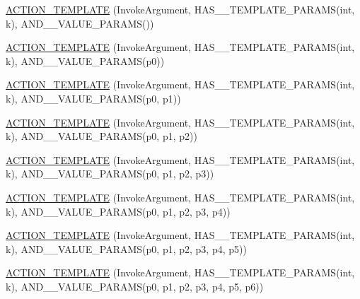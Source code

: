 \begin{DoxyCompactItemize}
\item 
\hyperlink{namespacetesting_a8a02397c7fdf8e84d559ab72dcc28eb1}{A\+C\+T\+I\+O\+N\+\_\+\+T\+E\+M\+P\+L\+A\+TE} (Invoke\+Argument, H\+A\+S\+\_\+\_\+\+T\+E\+M\+P\+L\+A\+T\+E\+\_\+\+P\+A\+R\+A\+MS(int, k), A\+N\+D\+\_\+\_\+\+V\+A\+L\+U\+E\+\_\+\+P\+A\+R\+A\+MS())
\item 
\hyperlink{namespacetesting_afaa0d88f5442f9aee5d6147377d3e50c}{A\+C\+T\+I\+O\+N\+\_\+\+T\+E\+M\+P\+L\+A\+TE} (Invoke\+Argument, H\+A\+S\+\_\+\_\+\+T\+E\+M\+P\+L\+A\+T\+E\+\_\+\+P\+A\+R\+A\+MS(int, k), A\+N\+D\+\_\+\_\+\+V\+A\+L\+U\+E\+\_\+\+P\+A\+R\+A\+MS(p0))
\item 
\hyperlink{namespacetesting_a39bf6c49dc1323cc9539a12249e60aba}{A\+C\+T\+I\+O\+N\+\_\+\+T\+E\+M\+P\+L\+A\+TE} (Invoke\+Argument, H\+A\+S\+\_\+\_\+\+T\+E\+M\+P\+L\+A\+T\+E\+\_\+\+P\+A\+R\+A\+MS(int, k), A\+N\+D\+\_\+\_\+\+V\+A\+L\+U\+E\+\_\+\+P\+A\+R\+A\+MS(p0, p1))
\item 
\hyperlink{namespacetesting_ac50647216fdf5197899a3d5034a9a670}{A\+C\+T\+I\+O\+N\+\_\+\+T\+E\+M\+P\+L\+A\+TE} (Invoke\+Argument, H\+A\+S\+\_\+\_\+\+T\+E\+M\+P\+L\+A\+T\+E\+\_\+\+P\+A\+R\+A\+MS(int, k), A\+N\+D\+\_\+\_\+\+V\+A\+L\+U\+E\+\_\+\+P\+A\+R\+A\+MS(p0, p1, p2))
\item 
\hyperlink{namespacetesting_ae98e43eecf8f44990b39b460f00b397b}{A\+C\+T\+I\+O\+N\+\_\+\+T\+E\+M\+P\+L\+A\+TE} (Invoke\+Argument, H\+A\+S\+\_\+\_\+\+T\+E\+M\+P\+L\+A\+T\+E\+\_\+\+P\+A\+R\+A\+MS(int, k), A\+N\+D\+\_\+\_\+\+V\+A\+L\+U\+E\+\_\+\+P\+A\+R\+A\+MS(p0, p1, p2, p3))
\item 
\hyperlink{namespacetesting_a505f6d82df233802c5f4235d77dca164}{A\+C\+T\+I\+O\+N\+\_\+\+T\+E\+M\+P\+L\+A\+TE} (Invoke\+Argument, H\+A\+S\+\_\+\_\+\+T\+E\+M\+P\+L\+A\+T\+E\+\_\+\+P\+A\+R\+A\+MS(int, k), A\+N\+D\+\_\+\_\+\+V\+A\+L\+U\+E\+\_\+\+P\+A\+R\+A\+MS(p0, p1, p2, p3, p4))
\item 
\hyperlink{namespacetesting_ab85e5f54a209bf141fc04f8612fbe887}{A\+C\+T\+I\+O\+N\+\_\+\+T\+E\+M\+P\+L\+A\+TE} (Invoke\+Argument, H\+A\+S\+\_\+\_\+\+T\+E\+M\+P\+L\+A\+T\+E\+\_\+\+P\+A\+R\+A\+MS(int, k), A\+N\+D\+\_\+\_\+\+V\+A\+L\+U\+E\+\_\+\+P\+A\+R\+A\+MS(p0, p1, p2, p3, p4, p5))
\item 
\hyperlink{namespacetesting_a8d3590561f334d165c620f522219831b}{A\+C\+T\+I\+O\+N\+\_\+\+T\+E\+M\+P\+L\+A\+TE} (Invoke\+Argument, H\+A\+S\+\_\+\_\+\+T\+E\+M\+P\+L\+A\+T\+E\+\_\+\+P\+A\+R\+A\+MS(int, k), A\+N\+D\+\_\+\_\+\+V\+A\+L\+U\+E\+\_\+\+P\+A\+R\+A\+MS(p0, p1, p2, p3, p4, p5, p6))
\item 

\end{DoxyCompactItemize}

